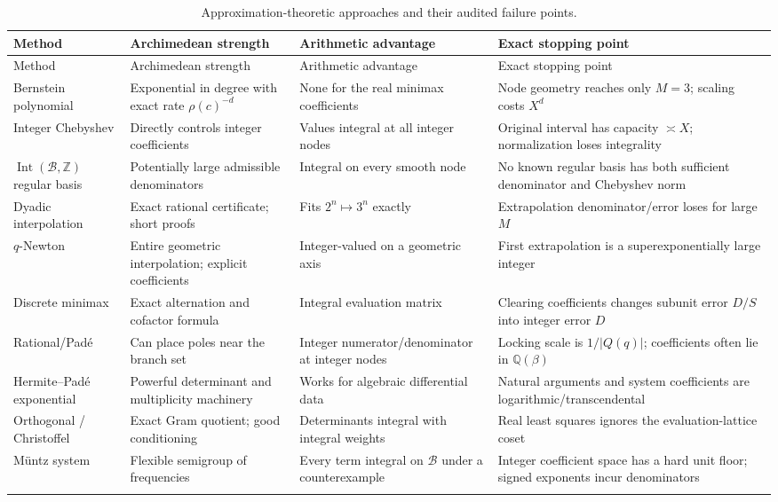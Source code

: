 \documentclass[11pt,oneside]{article}
\theoremstyle{definition}
\theoremstyle{remark}
\newcommand{\Z}{\mathbb Z}
\newcommand{\Q}{\mathbb Q}
\newcommand{\Bsem}{\mathcal B}
\newcommand{\Int}{\operatorname{Int}}
\begin{document}
{\small
\begin{longtable}{>{\raggedright\arraybackslash}p{}
                  >{\raggedright\arraybackslash}p{}
                  >{\raggedright\arraybackslash}p{}
                  >{\raggedright\arraybackslash}p{}}
\toprule
Method & Archimedean strength & Arithmetic advantage & Exact stopping point \\
\midrule
\endfirsthead
\toprule
Method & Archimedean strength & Arithmetic advantage & Exact stopping point \\
\midrule
\endhead
Bernstein polynomial & Exponential in degree with exact rate $\rho(c)^{-d}$ & None for the real minimax coefficients & Node geometry reaches only $M=3$; scaling costs $X^d$ \\

Integer Chebyshev & Directly controls integer coefficients & Values integral at all integer nodes & Original interval has capacity $\asymp X$; normalization loses integrality \\

$\Int(\Bsem,\Z)$ regular basis & Potentially large admissible denominators & Integral on every smooth node & No known regular basis has both sufficient denominator and Chebyshev norm \\

Dyadic interpolation & Exact rational certificate; short proofs & Fits $2^n\mapsto3^n$ exactly & Extrapolation denominator/error loses for large $M$ \\

$q$-Newton & Entire geometric interpolation; explicit coefficients & Integer-valued on a geometric axis & First extrapolation is a superexponentially large integer \\

Discrete minimax & Exact alternation and cofactor formula & Integral evaluation matrix & Clearing coefficients changes subunit error $D/S$ into integer error $D$ \\

Rational/Pad\'e & Can place poles near the branch set & Integer numerator/denominator at integer nodes & Locking scale is $1/|Q(q)|$; coefficients often lie in $\Q(\beta)$ \\

Hermite--Pad\'e exponential & Powerful determinant and multiplicity machinery & Works for algebraic differential data & Natural arguments and system coefficients are logarithmic/transcendental \\

Orthogonal / Christoffel & Exact Gram quotient; good conditioning & Determinants integral with integral weights & Real least squares ignores the evaluation-lattice coset \\

M\"untz system & Flexible semigroup of frequencies & Every term integral on $\Bsem$ under a counterexample & Integer coefficient space has a hard unit floor; signed exponents incur denominators \\
\bottomrule
\caption{Approximation-theoretic approaches and their audited failure points.}
\label{tab:comparison}
\end{longtable}
}
\end{document}
